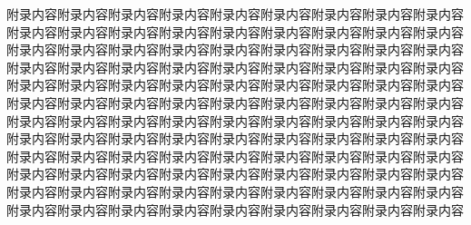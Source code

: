 附录内容附录内容附录内容附录内容附录内容附录内容附录内容附录内容附录内容附录内容附录内容附录内容附录内容附录内容附录内容附录内容附录内容附录内容附录内容附录内容附录内容附录内容附录内容附录内容附录内容附录内容附录内容附录内容附录内容附录内容附录内容附录内容附录内容附录内容附录内容附录内容附录内容附录内容附录内容附录内容附录内容附录内容附录内容附录内容附录内容附录内容附录内容附录内容附录内容附录内容附录内容附录内容附录内容附录内容附录内容附录内容附录内容附录内容附录内容附录内容附录内容附录内容附录内容附录内容附录内容附录内容附录内容附录内容附录内容附录内容附录内容附录内容附录内容附录内容附录内容附录内容附录内容附录内容附录内容附录内容附录内容附录内容附录内容附录内容附录内容附录内容附录内容附录内容附录内容附录内容附录内容附录内容附录内容附录内容附录内容附录内容附录内容附录内容附录内容附录内容附录内容附录内容附录内容附录内容附录内容附录内容附录内容附录内容